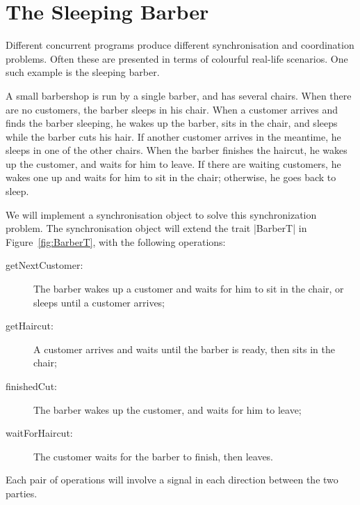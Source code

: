 \section{The Sleeping Barber}

Different concurrent programs produce different synchronisation and
coordination problems.  Often these are presented in terms of colourful
real-life scenarios.  One such example is the sleeping barber.

A small barbershop is run by a single barber, and has several chairs.  When
there are no customers, the barber sleeps in his chair.  When a customer
arrives and finds the barber sleeping, he wakes up the barber, sits in the
chair, and sleeps while the barber cuts his hair.  If another customer arrives
in the meantime, he sleeps in one of the other chairs.  When the barber
finishes the haircut, he wakes up the customer, and waits for him to leave.
If there are waiting customers, he wakes one up and waits for him to sit in
the chair; otherwise, he goes back to sleep.



We will implement a synchronisation object to solve this synchronization
problem.  The synchronisation object will extend the trait |BarberT| in
Figure~\ref{fig:BarberT}, with the following operations:
%
\begin{description}
\item[{\scalastyle getNextCustomer}:]
The barber wakes up a customer and waits for him to sit in the chair, or
sleeps until a customer arrives;

\item[{\scalastyle getHaircut}:]
A customer arrives and waits until the barber is ready, then sits in the
chair;

\item[{\scalastyle finishedCut}:]
The barber wakes up the customer, and waits for him to leave;

\item[{\scalastyle waitForHaircut}:]
The customer waits for the barber to finish, then leaves.
\end{description}
%
Each pair of operations will involve a signal in each direction between the two
parties.

